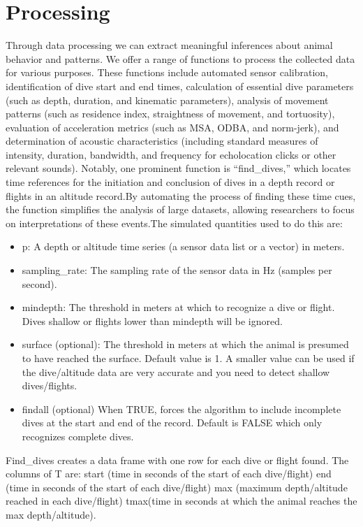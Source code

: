\hypertarget{processing}{%
\section{Processing}\label{processing}}

Through data processing we can extract meaningful inferences about animal behavior and patterns. We offer a range of functions to process the collected data for various purposes. These functions include automated sensor calibration, identification of dive start and end times, calculation of essential dive parameters (such as depth, duration, and kinematic parameters), analysis of movement patterns (such as residence index, straightness of movement, and tortuosity), evaluation of acceleration metrics (such as MSA, ODBA, and norm-jerk), and determination of acoustic characteristics (including standard measures of intensity, duration, bandwidth, and frequency for echolocation clicks or other relevant sounds). Notably, one prominent function is ``find\_dives,'' which locates time references for the initiation and conclusion of dives in a depth record or flights in an altitude record.By automating the process of finding these time cues, the function simplifies the analysis of large datasets, allowing researchers to focus on interpretations of these events.The simulated quantities used to do this are:

\begin{itemize}
\tightlist
\item
  p: A depth or altitude time series (a sensor data list or a vector) in meters.
\item
  sampling\_rate: The sampling rate of the sensor data in Hz (samples per second).
\item
  mindepth: The threshold in meters at which to recognize a dive or flight. Dives shallow or flights lower than mindepth will be ignored.
\item
  surface (optional): The threshold in meters at which the animal is presumed to have reached the surface. Default value is 1. A smaller value can be used if the dive/altitude data are very accurate and you need to detect shallow dives/flights.
\item
  findall (optional) When TRUE, forces the algorithm to include incomplete dives at the start and end of the record. Default is FALSE which only recognizes complete dives.
\end{itemize}

Find\_dives creates a data frame with one row for each dive or flight found. The columns of T are:
start (time in seconds of the start of each dive/flight)
end (time in seconds of the start of each dive/flight)
max (maximum depth/altitude reached in each dive/flight)
tmax(time in seconds at which the animal reaches the max depth/altitude).


